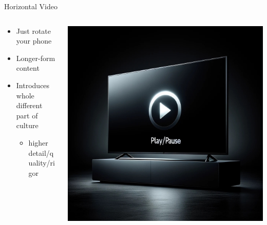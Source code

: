 \documentclass[aspectratio=169]{beamer}
\begin{document}
\begin{frame}{Horizontal Video}
\begin{columns}[T]
    \begin{column}[T]{0.5\textwidth}
        \begin{itemize}
            \item Just rotate your phone
                \item Longer-form content
                \item Introduces whole different part of culture
                \begin{itemize}
                    \item higher detail/quality/rigor
                \end{itemize}
        \end{itemize}
    \end{column}
    \begin{column}{0.5\textwidth}
        \includegraphics[height=0.8\textheight]{imgs/media/horizontal_vid.jpeg}
    \end{column}
\end{columns}
\end{frame}
\end{document}

